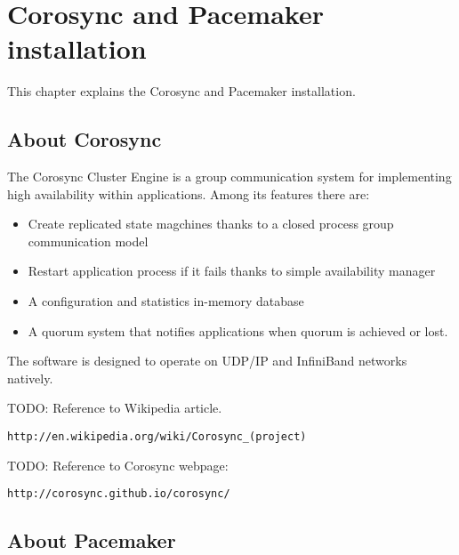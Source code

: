 

\chapter{Corosync and Pacemaker installation}
This chapter explains the Corosync and Pacemaker installation.

\section {About Corosync}
The Corosync Cluster Engine is a group communication system for implementing high availability within applications. Among its features there are:
\begin{itemize}
  \item Create replicated state magchines thanks to a closed process group communication model
  \item Restart application process if it fails thanks to simple availability manager
  \item A configuration and statistics in-memory database
  \item A quorum system that notifies applications when quorum is achieved or lost.
\end{itemize}


The software is designed to operate on UDP/IP and InfiniBand networks natively.

TODO: Reference to Wikipedia article.
\begin{verbatim}
http://en.wikipedia.org/wiki/Corosync_(project)
\end{verbatim}

TODO: Reference to Corosync webpage:
\begin{verbatim}
http://corosync.github.io/corosync/
\end{verbatim}

\section {\label{sec:about-pacemaker}About Pacemaker}

